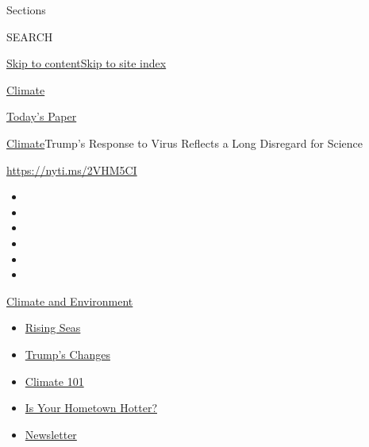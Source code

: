 Sections

SEARCH

\protect\hyperlink{site-content}{Skip to
content}\protect\hyperlink{site-index}{Skip to site index}

\href{https://www.nytimes3xbfgragh.onion/section/climate}{Climate}

\href{https://myaccount.nytimes3xbfgragh.onion/auth/login?response_type=cookie\&client_id=vi}{}

\href{https://www.nytimes3xbfgragh.onion/section/todayspaper}{Today's
Paper}

\href{/section/climate}{Climate}\textbar{}Trump's Response to Virus
Reflects a Long Disregard for Science

\url{https://nyti.ms/2VHM5CI}

\begin{itemize}
\item
\item
\item
\item
\item
\item
\end{itemize}

\href{https://www.nytimes3xbfgragh.onion/section/climate?action=click\&pgtype=Article\&state=default\&region=TOP_BANNER\&context=storylines_menu}{Climate
and Environment}

\begin{itemize}
\tightlist
\item
  \href{https://www.nytimes3xbfgragh.onion/2020/07/30/climate/sea-level-inland-floods.html?action=click\&pgtype=Article\&state=default\&region=TOP_BANNER\&context=storylines_menu}{Rising
  Seas}
\item
  \href{https://www.nytimes3xbfgragh.onion/interactive/2020/climate/trump-environment-rollbacks.html?action=click\&pgtype=Article\&state=default\&region=TOP_BANNER\&context=storylines_menu}{Trump's
  Changes}
\item
  \href{https://www.nytimes3xbfgragh.onion/interactive/2020/04/19/climate/climate-crash-course-1.html?action=click\&pgtype=Article\&state=default\&region=TOP_BANNER\&context=storylines_menu}{Climate
  101}
\item
  \href{https://www.nytimes3xbfgragh.onion/interactive/2018/08/30/climate/how-much-hotter-is-your-hometown.html?action=click\&pgtype=Article\&state=default\&region=TOP_BANNER\&context=storylines_menu}{Is
  Your Hometown Hotter?}
\item
  \href{https://www.nytimes3xbfgragh.onion/newsletters/climate-change?action=click\&pgtype=Article\&state=default\&region=TOP_BANNER\&context=storylines_menu}{Newsletter}
\end{itemize}

